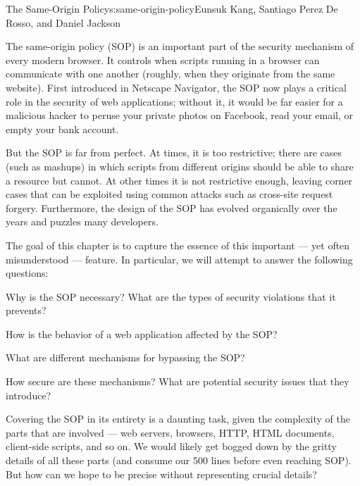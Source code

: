 \begin{aosachapter}{The Same-Origin Policy}{s:same-origin-policy}{Eunsuk Kang, Santiago Perez De Rosso, and Daniel Jackson}

\label{introduction}

The same-origin policy (SOP) is an important part of the security
mechanism of every modern browser. It controls when scripts running in a
browser can communicate with one another (roughly, when they originate
from the same website). First introduced in Netscape Navigator, the SOP
now plays a critical role in the security of web applications; without
it, it would be far easier for a malicious hacker to peruse your private
photos on Facebook, read your email, or empty your bank account.

But the SOP is far from perfect. At times, it is too restrictive; there
are cases (such as mashups) in which scripts from different origins
should be able to share a resource but cannot. At other times it is not
restrictive enough, leaving corner cases that can be exploited using
common attacks such as cross-site request forgery. Furthermore, the
design of the SOP has evolved organically over the years and puzzles
many developers.

The goal of this chapter is to capture the essence of this important ---
yet often misunderstood --- feature. In particular, we will attempt to
answer the following questions:

\begin{aosaitemize}

\item
  Why is the SOP necessary? What are the types of security violations
  that it prevents?
\item
  How is the behavior of a web application affected by the SOP?
\item
  What are different mechanisms for bypassing the SOP?
\item
  How secure are these mechanisms? What are potential security issues
  that they introduce?
\end{aosaitemize}

Covering the SOP in its entirety is a daunting task, given the
complexity of the parts that are involved --- web servers, browsers,
HTTP, HTML documents, client-side scripts, and so on. We would likely
get bogged down by the gritty details of all these parts (and consume
our 500 lines before even reaching SOP). But how can we hope to be
precise without representing crucial details?


\end{aosachapter}

